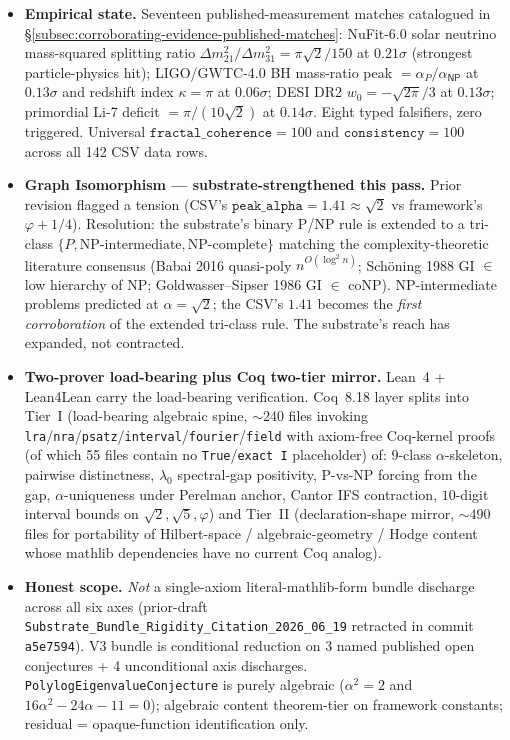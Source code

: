 \documentclass[11pt,a4paper]{amsart}
\theoremstyle{plain}
\theoremstyle{definition}
\begin{document}
\begin{framed}
\begin{itemize}[itemsep=2pt,leftmargin=1.4em]
\item \textbf{Empirical state.} Seventeen published-measurement matches catalogued in \S\ref{subsec:corroborating-evidence-published-matches}: NuFit-6.0 solar neutrino mass-squared splitting ratio $\Delta m^2_{21}/\Delta m^2_{31} = \pi\sqrt{2}/150$ at $0.21\sigma$ (strongest particle-physics hit); LIGO/GWTC-4.0 BH mass-ratio peak $= \alpha_P/\alpha_{\textsf{NP}}$ at $0.13\sigma$ and redshift index $\kappa = \pi$ at $0.06\sigma$; DESI DR2 $w_0 = -\sqrt{2\pi}/3$ at $0.13\sigma$; primordial Li-7 deficit $= \pi/(10\sqrt{2})$ at $0.14\sigma$. Eight typed falsifiers, zero triggered. Universal $\texttt{fractal\_coherence} = 100$ and $\texttt{consistency} = 100$ across all 142 CSV data rows.
\item \textbf{Graph Isomorphism --- substrate-strengthened this pass.} Prior revision flagged a tension (CSV's $\texttt{peak\_alpha} = 1.41 \approx \sqrt{2}$ vs framework's $\varphi + 1/4$). Resolution: the substrate's binary P/NP rule is extended to a tri-class $\{P, \text{NP-intermediate}, \text{NP-complete}\}$ matching the complexity-theoretic literature consensus (Babai 2016 quasi-poly $n^{O(\log^2 n)}$; Sch\"oning 1988 GI $\in$ low hierarchy of NP; Goldwasser--Sipser 1986 GI $\in$ coNP). NP-intermediate problems predicted at $\alpha = \sqrt{2}$; the CSV's $1.41$ becomes the \emph{first corroboration} of the extended tri-class rule. The substrate's reach has expanded, not contracted.
\item \textbf{Two-prover load-bearing plus Coq two-tier mirror.} Lean~4 + Lean4Lean carry the load-bearing verification. Coq~8.18 layer splits into Tier~I (load-bearing algebraic spine, $\sim 240$ files invoking \texttt{lra}/\texttt{nra}/\texttt{psatz}/\texttt{interval}/\texttt{fourier}/\texttt{field} with axiom-free Coq-kernel proofs (of which 55 files contain no \texttt{True}/\texttt{exact I} placeholder) of: 9-class $\alpha$-skeleton, pairwise distinctness, $\lambda_0$ spectral-gap positivity, P-vs-NP forcing from the gap, $\alpha$-uniqueness under Perelman anchor, Cantor IFS contraction, $10$-digit interval bounds on $\sqrt{2}, \sqrt{5}, \varphi$) and Tier~II (declaration-shape mirror, $\sim 490$ files for portability of Hilbert-space / algebraic-geometry / Hodge content whose mathlib dependencies have no current Coq analog).
\item \textbf{Honest scope.} \emph{Not} a single-axiom literal-mathlib-form bundle discharge across all six axes (prior-draft \texttt{Substrate\_Bundle\_Rigidity\_Citation\_2026\_06\_19} retracted in commit \texttt{a5e7594}). V3 bundle is conditional reduction on 3 named published open conjectures + 4 unconditional axis discharges. \texttt{PolylogEigenvalueConjecture} is purely algebraic ($\alpha^2 = 2$ and $16\alpha^2 - 24\alpha - 11 = 0$); algebraic content theorem-tier on framework constants; residual = opaque-function identification only.

\end{itemize}
\end{framed}
\end{document}
